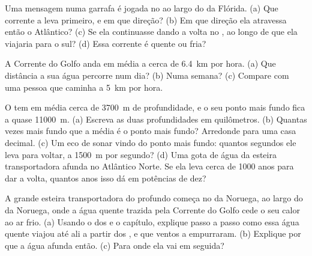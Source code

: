 \begin{exercise}[$\star\star$]\label{exo:g8:the-oceans:9}
Uma mensagem numa garrafa é jogada no  ao largo do  da Flórida.
(a) Que corrente a leva primeiro, e em que direção? (b) Em que direção
ela atravessa então o Atlântico? (c) Se ela continuasse dando a volta no
, ao longo de que  ela viajaria para o sul? (d) Essa corrente é
quente ou fria?
\end{exercise}

\begin{exercise}[$\star\star$]\label{exo:g8:the-oceans:10}
A Corrente do Golfo anda em média a cerca de \qty{6.4}{km} por hora.
(a) Que distância a sua água percorre num dia? (b) Numa semana?
(c) Compare com uma pessoa que caminha a \qty{5}{km} por hora.
\end{exercise}

\begin{exercise}[$\star\star\star$]\label{exo:g8:the-oceans:11}
O  tem em média cerca de \qty{3700}{m} de profundidade, e o seu
ponto mais fundo fica a quase \qty{11000}{m}. (a) Escreva as duas
profundidades em quilômetros. (b) Quantas vezes mais fundo que a média é
o ponto mais fundo? Arredonde para uma casa decimal. (c) Um eco de sonar
vindo do ponto mais fundo: quantos segundos ele leva para voltar, a
\qty{1500}{m} por segundo? (d) Uma gota de água da esteira transportadora
afunda no Atlântico Norte. Se ela leva cerca de \num{1000} anos para dar a
volta, quantos anos isso dá em potências de dez?
\end{exercise}

\begin{exercise}[$\star\star\star$]\label{exo:g8:the-oceans:12}
A grande esteira transportadora do  profundo começa no  da
Noruega, ao largo do  da Noruega, onde a água quente trazida pela
Corrente do Golfo cede o seu calor ao ar frio. (a) Usando o  dos 
e o capítulo, explique passo a passo como essa água quente viajou até ali
a partir dos , e que ventos a empurraram. (b) Explique por que a
água afunda então. (c) Para onde ela vai em seguida?
\end{exercise}

